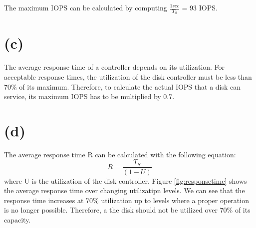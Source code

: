 \documentclass{article}
\begin{document}
The maximum IOPS can be calculated by computing $\frac{1sec}{T_S}$ = 93 IOPS.

\section*{(c)}
The average response time of a controller depends on its utilization. For acceptable response times, the utilization of the disk controller must be less than 70\% of its maximum. Therefore, to calculate the actual IOPS that a disk can service, its maximum IOPS has to be multiplied by 0.7.

\section*{(d)}
The average response time R can be calculated with the following equation:
\begin{equation}
R = \frac{T_S}{(1-U)}
\end{equation}
where U is the utilization of the disk controller. Figure \ref{fig:responsetime} shows the average response time over changing utilizatipn levels. We can see that the response time increases at 70\% utilization up to levels where a proper operation is no longer possible. Therefore, a the disk should not be utilized over 70\% of its capacity.
\end{document}
